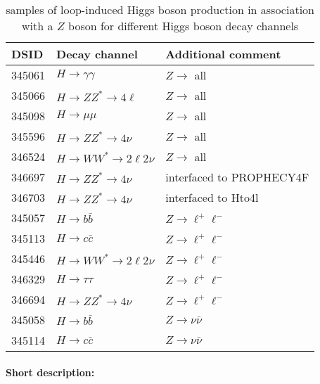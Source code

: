 \begin{table}[!htbp]
\begin{center}
\caption{\POWPY[8] samples of loop-induced Higgs boson production in association with a $Z$ boson for different
Higgs boson decay channels} 
\label{tab:higgs-ggZH-samples}
\begin{tabular}{ l | l | l}
\hline
DSID   & Decay channel & Additional comment \\
\hline
345061 & $H\to \gamma\gamma$ & $Z\to$ all \\
345066 & $H\to ZZ^{*} \to 4\ell$ & $Z\to$ all \\
345098 & $H\to \mu\mu$ & $Z\to$ all \\
345596 & $H\to ZZ^{*} \to 4\nu$ & $Z\to$ all \\
346524 & $H\to WW^{*} \to 2\ell2\nu $ & $Z\to$ all \\
346697 & $H\to ZZ^{*} \to 4\nu$ & interfaced to PROPHECY4F \\
346703 & $H\to ZZ^{*} \to 4\nu$ & interfaced to Hto4l \\
345057 & $H\to b\bar{b}$ &  $Z\to \ell^{+}\ell^{-}$\\ 
345113 &  $H\to c\bar{c}$ & $Z\to \ell^{+}\ell^{-}$\\
345446 & $H\to WW^{*} \to 2\ell2\nu$ &  $Z\to \ell^{+}\ell^{-}$\\
346329 & $H\to \tau\tau$ &  $Z\to \ell^{+}\ell^{-}$\\
346694 & $H\to ZZ^{*} \to 4\nu$ &  $Z\to \ell^{+}\ell^{-}$\\
345058 & $ H\to b\bar{b}$ & $Z\to \nu\bar{\nu}$\\
345114 & $ H\to c\bar{c}$ & $Z\to \nu\bar{\nu}$\\
\hline
\end{tabular}
\end{center}
\end{table}





\paragraph{Short description:}


